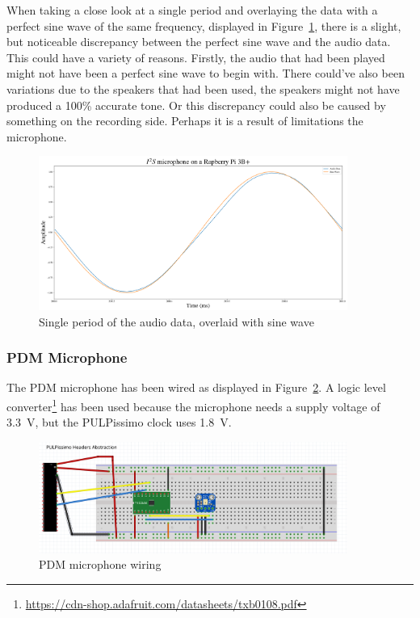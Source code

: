 When taking a close look at a single period and overlaying the data with a perfect sine wave of the same
frequency, displayed in Figure~\ref{fig:i2s_period}, there is a slight, but noticeable discrepancy between the perfect sine
wave and the audio data.
This could have a variety of reasons.
Firstly, the audio that had been played might not have been a perfect sine wave to begin with.
There could've also been variations due to the speakers that had been used, the speakers
might not have produced a 100\% accurate tone.
Or this discrepancy could also be caused by something on the recording side.
Perhaps it is a result of limitations the microphone.

\begin{figure}[H]
    \centering
    \includegraphics[width=0.9\textwidth]{figures/i2s/i2s_one_period.png}
    \caption[A single period of the normalized audio data, overlaid with perfect sine wave of the same frequency]{Single period of the audio data, overlaid with sine wave}
    \label{fig:i2s_period}
\end{figure}

\subsubsection{PDM Microphone}

The PDM microphone has been wired as displayed in Figure~\ref{fig:pdm_wiring}.
A logic level converter\footnote{\url{https://cdn-shop.adafruit.com/datasheets/txb0108.pdf}}
has been used because the microphone needs a supply voltage of \SI{3.3}{\volt}, but the
PULPissimo clock uses \SI{1.8}{\volt}.

\begin{figure}[H]
    \centering
    \includegraphics[width=0.9\textwidth]{figures/pdm/wiring.png}
    \caption[PDM microphone wiring with an abstraction for the PULPissimo]{PDM microphone wiring}
    \label{fig:pdm_wiring}
\end{figure}


